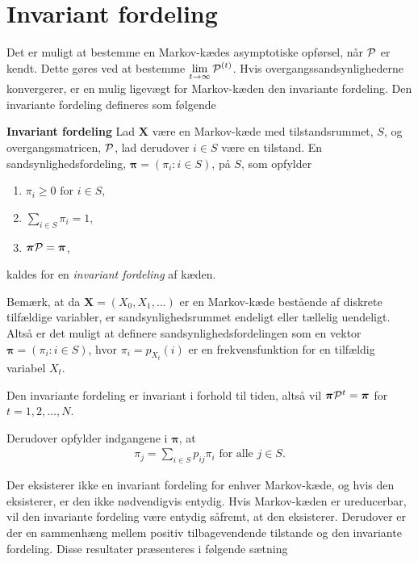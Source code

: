 \section{Invariant fordeling}
Det er muligt at bestemme en Markov-kædes asymptotiske opførsel, når $\P$ er kendt. Dette gøres ved at bestemme $\displaystyle \lim_{t \to \infty} \P^{(t)}$. Hvis overgangssandsynlighederne konvergerer, er en mulig ligevægt for Markov-kæden den invariante fordeling. Den invariante fordeling defineres som følgende
%
\begin{defn}\textbf{Invariant fordeling} \label{defn: invariant_fordeling} %
\newline 
Lad $\bm X$ være en Markov-kæde med tilstandsrummet, $S$, og overgangsmatricen, $\P$, lad derudover $i\in S$ være en tilstand. En sandsynlighedsfordeling, $\bm\pi=(\pi_i : i \in S)$, på $S$, som opfylder
\begin{enumerate}
    \item $\pi_i\geq 0 \text{ for } i\in S$,
    \item $\displaystyle\sum_{i\in S} \pi_i=1$,
    \item $\bm\pi \P=\bm\pi$,
\end{enumerate}
kaldes for en \textit{invariant fordeling} af kæden. 
\end{defn}
Bemærk, at da $\bm X = (X_0, X_1, \ldots)$ er en Markov-kæde bestående af diskrete tilfældige variabler, er sandsynlighedsrummet endeligt eller tællelig uendeligt. Altså er det muligt at definere sandsynlighedsfordelingen som en vektor $\bm {\pi} = (\pi_i: i \in S)$, hvor $\pi_i = p_{X_t} (i)$ er en frekvensfunktion for en tilfældig variabel $X_t$. 

Den invariante fordeling er invariant i forhold til tiden, altså vil $\bm \pi \P^t = \bm\pi$ for $t = 1, 2, \ldots, N$. 

Derudover opfylder indgangene i $\bm \pi$, at
\begin{align}\label{eq:sum_invariant_fordeling}
     \pi_j=\sum_{i\in S}p_{ij}\pi_i \text{ for alle } j\in S. 
\end{align}

Der eksisterer ikke en invariant fordeling for enhver Markov-kæde, og hvis den eksisterer, er den ikke nødvendigvis entydig. 
Hvis Markov-kæden er ureducerbar, vil den invariante fordeling være entydig såfremt, at den eksisterer. Derudover er der en sammenhæng mellem positiv tilbagevendende tilstande og den invariante fordeling. Disse resultater præsenteres i følgende sætning

